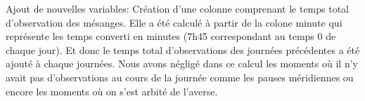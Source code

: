 \documentclass[
  french,
]{article}
\newenvironment{Shaded}{\begin{snugshade}}{\end{snugshade}}
\newcommand{\AttributeTok}[1]{\textcolor[rgb]{0.13,0.29,0.53}{#1}}
\newcommand{\DecValTok}[1]{\textcolor[rgb]{0.00,0.00,0.81}{#1}}
\newcommand{\FunctionTok}[1]{\textcolor[rgb]{0.13,0.29,0.53}{\textbf{#1}}}
\newcommand{\NormalTok}[1]{#1}
\newcommand{\OtherTok}[1]{\textcolor[rgb]{0.56,0.35,0.01}{#1}}
\newcommand{\SpecialCharTok}[1]{\textcolor[rgb]{0.81,0.36,0.00}{\textbf{#1}}}
\begin{document}
Ajout de nouvelles variables: Création d'une colonne comprenant le temps
total d'observation des mésanges. Elle a été calculé à partir de la
colone minute qui représente les temps converti en minutes (7h45
correspondant au temps 0 de chaque jour). Et donc le temps total
d'observations des journées précédentes a été ajouté à chaque journées.
Nous avons négligé dans ce calcul les moments où il n'y avait pas
d'observations au cours de la journée comme les pauses méridiennes ou
encore les moments où on s'est arbité de l'averse.

\begin{Shaded}
\end{Shaded}
\end{document}
